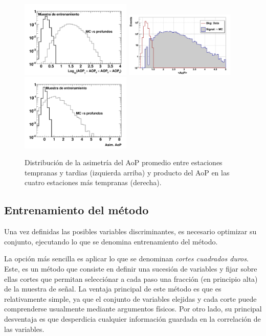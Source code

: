 	\begin{figure}
	\begin{center}
	\includegraphics[width=0.47\textwidth]{fig/seleccionAuger/aop_prod.pdf} \hfill
	\includegraphics[width=0.47\textwidth]{fig/seleccionAuger/trainning_withMCSimple_log_forThesis}\\
	\includegraphics[width=0.47\textwidth]{fig/seleccionAuger/asim.pdf}
	
	\caption{Distribución de la asimetría del AoP promedio entre estaciones tempranas y tardias (izquierda arriba) y producto del AoP en las cuatro estaciones más tempranas (derecha).}
	\label{fig:observablesGlobales}
	\end{center}
	\end{figure}
	\subsection{Entrenamiento del método}
	
	Una vez definidas las posibles variables discriminantes, es necesario optimizar su conjunto, ejecutando lo que se denomina entrenamiento del método.
	
	La opción más sencilla es aplicar lo que se denominan \emph{cortes cuadrados duros}.
	Este, es un método que consiste en definir una sucesión de variables y fijar sobre ellas cortes que permitan selecciónar a cada paso una fracción (en principio alta) de la muestra de señal.
	La ventaja principal de este método es que es relativamente simple, ya que el conjunto de variables elejidas y cada corte puede comprenderse usualmente mediante argumentos físicos.
	Por otro lado, su principal desventaja es que desperdicia cualquier información guardada en la correlación de las variables.
	
